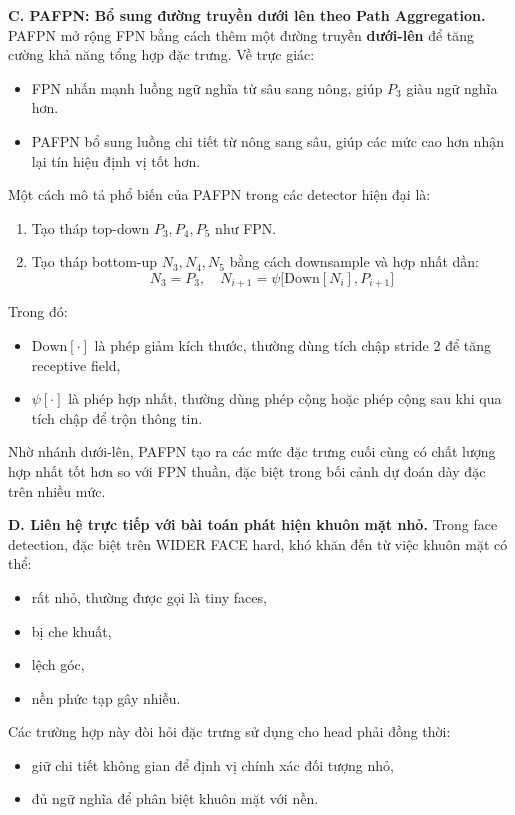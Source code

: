 \medskip
\noindent\textbf{C. PAFPN: Bổ sung đường truyền dưới lên theo Path Aggregation.}
PAFPN mở rộng FPN bằng cách thêm một đường truyền \textbf{dưới-lên} để tăng cường khả năng tổng hợp đặc trưng. Về trực giác:

\begin{itemize}
  \item FPN nhấn mạnh luồng ngữ nghĩa từ sâu sang nông, giúp $P_3$ giàu ngữ nghĩa hơn.
  \item PAFPN bổ sung luồng chi tiết từ nông sang sâu, giúp các mức cao hơn nhận lại tín hiệu định vị tốt hơn.
\end{itemize}

Một cách mô tả phổ biến của PAFPN trong các detector hiện đại là:
\begin{enumerate}
  \item Tạo tháp top-down $P_3, P_4, P_5$ như FPN.
  \item Tạo tháp bottom-up $N_3, N_4, N_5$ bằng cách downsample và hợp nhất dần:
  \[
  N_3 = P_3,\quad
  N_{i+1} = \psi\bigl[\text{Down}[N_i], P_{i+1}\bigr]
  \]
\end{enumerate}

Trong đó:
\begin{itemize}
  \item $\text{Down}[\cdot]$ là phép giảm kích thước, thường dùng tích chập stride 2 để tăng receptive field,
  \item $\psi[\cdot]$ là phép hợp nhất, thường dùng phép cộng hoặc phép cộng sau khi qua tích chập để trộn thông tin.
\end{itemize}

Nhờ nhánh dưới-lên, PAFPN tạo ra các mức đặc trưng cuối cùng có chất lượng hợp nhất tốt hơn so với FPN thuần, đặc biệt trong bối cảnh dự đoán dày đặc trên nhiều mức.

\medskip
\noindent\textbf{D. Liên hệ trực tiếp với bài toán phát hiện khuôn mặt nhỏ.}
Trong face detection, đặc biệt trên WIDER FACE hard, khó khăn đến từ việc khuôn mặt có thể:

\begin{itemize}
  \item rất nhỏ, thường được gọi là tiny faces,
  \item bị che khuất,
  \item lệch góc,
  \item nền phức tạp gây nhiễu.
\end{itemize}

Các trường hợp này đòi hỏi đặc trưng sử dụng cho head phải đồng thời:
\begin{itemize}
  \item giữ chi tiết không gian để định vị chính xác đối tượng nhỏ,
  \item đủ ngữ nghĩa để phân biệt khuôn mặt với nền.
\end{itemize}

